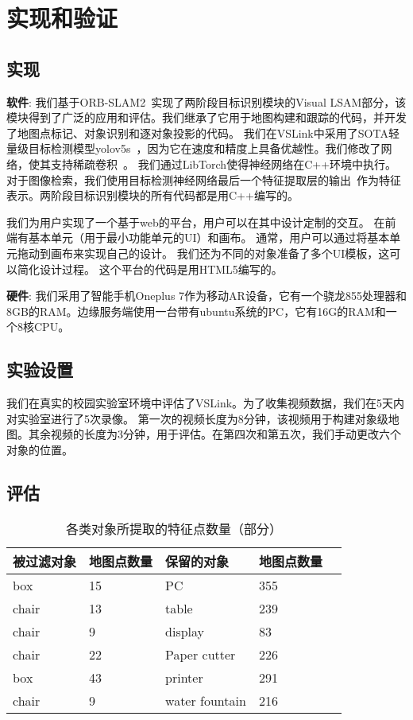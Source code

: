 \chapter{实现和验证}\label{chap:eval}
\section{实现}
\textbf{软件}: 我们基于ORB-SLAM2~\cite{mur2017orb}实现了两阶段目标识别模块的Visual LSAM部分，该模块得到了广泛的应用和评估。我们继承了它用于地图构建和跟踪的代码，并开发了地图点标记、对象识别和逐对象投影的代码。
我们在VSLink中采用了SOTA轻量级目标检测模型yolov5s~\cite{glenn_jocher_2020_4154370}，因为它在速度和精度上具备优越性。我们修改了网络，使其支持稀疏卷积~\cite{ren2018sbnet}。
我们通过LibTorch使得神经网络在C++环境中执行。
对于图像检索，我们使用目标检测神经网络最后一个特征提取层的输出~\cite{glenn_jocher_2020_4154370}作为特征表示。两阶段目标识别模块的所有代码都是用C++编写的。

我们为用户实现了一个基于web的平台，用户可以在其中设计定制的交互。
在前端有基本单元（用于最小功能单元的UI）和画布。
通常，用户可以通过将基本单元拖动到画布来实现自己的设计。
我们还为不同的对象准备了多个UI模板，这可以简化设计过程。
这个平台的代码是用HTML5编写的。

\textbf{硬件}: 我们采用了智能手机Oneplus 7作为移动AR设备，它有一个骁龙855处理器和8GB的RAM。边缘服务端使用一台带有ubuntu系统的PC，它有16G的RAM和一个8核CPU。
\section{实验设置}

我们在真实的校园实验室环境中评估了VSLink。为了收集视频数据，我们在5天内对实验室进行了5次录像。
第一次的视频长度为8分钟，该视频用于构建对象级地图。其余视频的长度为3分钟，用于评估。在第四次和第五次，我们手动更改六个对象的位置。

\section{评估}

\begin{table}  
	\small  
	\caption{各类对象所提取的特征点数量（部分）}  
	\begin{center}  
		\begin{tabular}{|l|l|l|l| p{4cm}|}  
			\hline  
			\textbf{被过滤对象} & \textbf{地图点数量} & \textbf{保留的对象} & \textbf{地图点数量}\\ \hline  
			box & 15 & PC & 355  \\ \hline 
			chair & 13 & table & 239  \\ \hline 
			chair & 9 & display & 83  \\ \hline  
			chair & 22 & Paper cutter & 226  \\ \hline  
			box & 43 & printer & 291  \\ \hline  
			chair & 9 & water fountain & 216  \\ \hline  
		\end{tabular}  
	\end{center}  
\end{table}\label{table:mps}  

